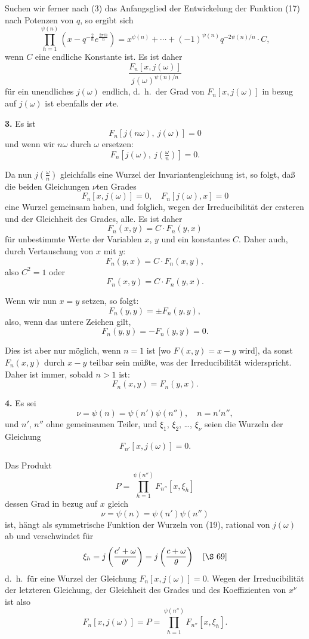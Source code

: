 \documentclass[12pt,a4paper]{article}
\theoremstyle{definition}
\begin{document}
Suchen wir ferner nach (3) das Anfangsglied der Entwickelung der Funktion (17) nach Potenzen von $q$, so ergibt sich
\[
\prod_{h=1}^{\psi(n)} \left(x - q^{-\frac{2}{n}} e^{\frac{2\pi i h}{n}}\right) = x^{\psi(n)} + \cdots + (-1)^{\psi(n)} q^{-2\psi(n)/n} \cdot C,
\]
wenn $C$ eine endliche Konstante ist. Es ist daher
\[
\frac{F_n[x, j(\omega)]}{j(\omega)^{\psi(n)/n}}
\]
für ein unendliches $j(\omega)$ endlich, d.~h.\ der Grad von $F_n[x, j(\omega)]$ in bezug auf $j(\omega)$ ist ebenfalls der $\nu$te.

\textbf{3.} Es ist
\[
F_n[j(n\omega),\ j(\omega)] = 0
\]
und wenn wir $n\omega$ durch $\omega$ ersetzen:
\[
F_n[j(\omega),\ j(\tfrac{\omega}{n})] = 0.
\]

Da nun $j(\frac{\omega}{n})$ gleichfalls eine Wurzel der Invariantengleichung ist, so folgt, daß die beiden Gleichungen $\nu$ten Grades
\[
F_n[x, j(\omega)] = 0, \quad F_n[j(\omega), x] = 0
\]
eine Wurzel gemeinsam haben, und folglich, wegen der Irreducibilität der ersteren und der Gleichheit des Grades, alle. Es ist daher
\[
F_n(x, y) = C \cdot F_n(y, x)
\]
für unbestimmte Werte der Variablen $x$, $y$ und ein konstantes $C$. Daher auch, durch Vertauschung von $x$ mit $y$:
\[
F_n(y, x) = C \cdot F_n(x, y),
\]
also $C^2 = 1$ oder
\[
F_n(x, y) = C \cdot F_n(y, x).
\]

Wenn wir nun $x = y$ setzen, so folgt:
\[
F_n(y, y) = \pm F_n(y, y),
\]
also, wenn das untere Zeichen gilt,
\[
F_n(y, y) = -F_n(y, y) = 0.
\]

Dies ist aber nur möglich, wenn $n = 1$ ist [wo $F(x, y) = x - y$ wird], da sonst $F_n(x, y)$ durch $x - y$ teilbar sein müßte, was der Irreducibilität widerspricht. Daher ist immer, sobald $n > 1$ ist:
\begin{equation}\label{eq:69-18}
F_n(x, y) = F_n(y, x).
\end{equation}

\textbf{4.} Es sei
\[
\nu = \psi(n) = \psi(n')\psi(n''), \quad n = n'n'',
\]
und $n'$, $n''$ ohne gemeinsamen Teiler, und $\xi_1$, $\xi_2$, \ldots, $\xi_\nu$ seien die Wurzeln der Gleichung
\begin{equation}\label{eq:69-19}
F_{n'}[x, j(\omega)] = 0.
\end{equation}

Das Produkt
\begin{equation}\label{eq:69-20}
P = \prod_{h=1}^{\psi(n'')} F_{n''}[x, \xi_h]
\end{equation}
dessen Grad in bezug auf $x$ gleich
\[
\nu = \psi(n) = \psi(n')\psi(n'')
\]
ist, hängt als symmetrische Funktion der Wurzeln von (19), rational von $j(\omega)$ ab und verschwindet für
\[
\xi_h = j\left(\frac{c' + \omega}{\theta'}\right) = j\left(\frac{c + \omega}{\theta}\right) \quad [\S\ 69]
\]
d.~h.\ für eine Wurzel der Gleichung $F_n[x, j(\omega)] = 0$. Wegen der Irreducibilität der letzteren Gleichung, der Gleichheit des Grades und des Koeffizienten von $x^\nu$ ist also
\begin{equation}\label{eq:69-21}
F_n[x, j(\omega)] = P = \prod_{h=1}^{\psi(n'')} F_{n''}[x, \xi_h].
\end{equation}
\end{document}
